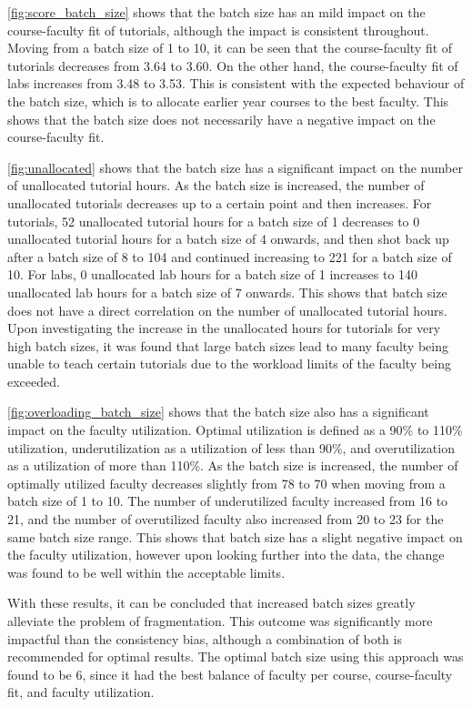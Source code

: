 \autoref{fig:score_batch_size} shows that the batch size has an mild impact on the course-faculty fit of tutorials, although the impact is consistent throughout. Moving from a batch size of 1 to 10, it can be seen that the course-faculty fit of tutorials decreases from 3.64 to 3.60. On the other hand, the course-faculty fit of labs increases from 3.48 to 3.53. This is consistent with the expected behaviour of the batch size, which is to allocate earlier year courses to the best faculty. This shows that the batch size does not necessarily have a negative impact on the course-faculty fit.

\autoref{fig:unallocated} shows that the batch size has a significant impact on the number of unallocated tutorial hours. As the batch size is increased, the number of unallocated tutorials decreases up to a certain point and then increases. For tutorials, 52 unallocated tutorial hours for a batch size of 1 decreases to 0 unallocated tutorial hours for a batch size of 4 onwards, and then shot back up after a batch size of 8 to 104 and continued increasing to 221 for a batch size of 10. For labs, 0 unallocated lab hours for a batch size of 1 increases to 140 unallocated lab hours for a batch size of 7 onwards. This shows that batch size does not have a direct correlation on the number of unallocated tutorial hours. Upon investigating the increase in the unallocated hours for tutorials for very high batch sizes, it was found that large batch sizes lead to many faculty being unable to teach certain tutorials due to the workload limits of the faculty being exceeded.

\autoref{fig:overloading_batch_size} shows that the batch size also has a significant impact on the faculty utilization. Optimal utilization is defined as a 90\% to 110\% utilization, underutilization as a utilization of less than 90\%, and overutilization as a utilization of more than 110\%. As the batch size is increased, the number of optimally utilized faculty decreases slightly from 78 to 70 when moving from a batch size of 1 to 10. The number of underutilized faculty increased from 16 to 21, and the number of overutilized faculty also increased from 20 to 23 for the same batch size range. This shows that batch size has a slight negative impact on the faculty utilization, however upon looking further into the data, the change was found to be well within the acceptable limits.

With these results, it can be concluded that increased batch sizes greatly alleviate the problem of fragmentation. This outcome was significantly more impactful than the consistency bias, although a combination of both is recommended for optimal results. The optimal batch size using this approach was found to be 6, since it had the best balance of faculty per course, course-faculty fit, and faculty utilization.


